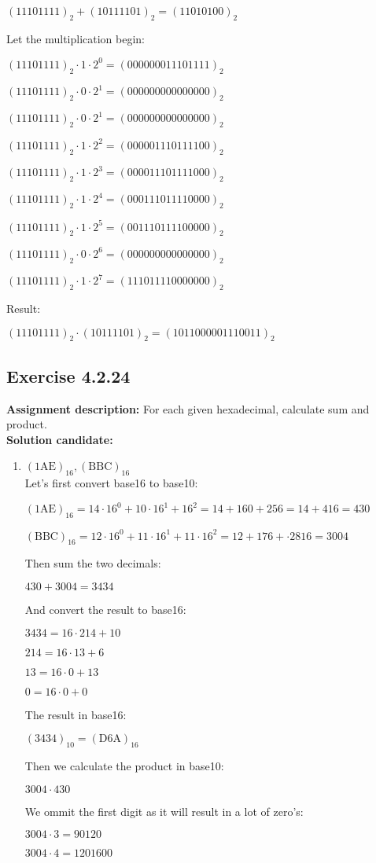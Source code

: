 \documentclass{report}
\newcommand{\cent}[1]{\begin{center}#1\end{center}}
\newcommand{\AssignmentDescription}{\textbf{Assignment description: }}
\newcommand{\Solution}{\textbf{Solution candidate: }}
\newcommand{\Exercise}[1]{\subsection{Exercise #1}}
\newcommand{\defaultEnumerateLabel}{\textbf{\alph*.}}
\newcommand{\MyItem}[1]{\item #1\\}
\newcommand{\decimal}[1]{(#1)_{10}}
\newcommand{\binary}[1]{(#1)_2}
\newcommand{\hexadec}[1]{(\text{#1})_{16}}
\begin{document}
\begin{enumerate}[label=\defaultEnumerateLabel]
\begin{enumerate}[label=\defaultEnumerateLabel]
		\cent{$\binary{11101111} + \binary{10111101} = \binary{11010100}$}
		Let the multiplication begin:
		\cent{$\binary{11101111} \cdot 1 \cdot 2^0 = \binary{000000011101111}$}
		\cent{$\binary{11101111} \cdot 0 \cdot 2^1 = \binary{000000000000000}$}
		\cent{$\binary{11101111} \cdot 0 \cdot 2^1 = \binary{000000000000000}$}
		\cent{$\binary{11101111} \cdot 1 \cdot 2^2 = \binary{000001110111100}$}
		\cent{$\binary{11101111} \cdot 1 \cdot 2^3 = \binary{000011101111000}$}
		\cent{$\binary{11101111} \cdot 1 \cdot 2^4 = \binary{000111011110000}$}
		\cent{$\binary{11101111} \cdot 1 \cdot 2^5 = \binary{001110111100000}$}
		\cent{$\binary{11101111} \cdot 0 \cdot 2^6 = \binary{000000000000000}$}
		\cent{$\binary{11101111} \cdot 1 \cdot 2^7 = \binary{111011110000000}$}
		
		Result:
		
		\cent{$\binary{11101111} \cdot \binary{10111101} = \binary{1011000001110011}$}
		
	\end{enumerate}
	\Exercise{4.2.24}
	\AssignmentDescription
	For each given hexadecimal, calculate sum and product. \\
	
	\Solution
	
	\begin{enumerate}[label = \defaultEnumerateLabel]
		\MyItem{$\hexadec{1AE}, \hexadec{BBC}$}
		
		Let's first convert base16 to base10:
		
		\cent{$\hexadec{1AE} = 14 \cdot 16^0 + 10 \cdot 16^1 + 16^2 =  14 + 160 + 256 = 14 + 416 = 430$}
		\cent{$\hexadec{BBC} = 12 \cdot 16^0 + 11 \cdot 16^1 + 11 \cdot  16^2 = 12 + 176+ \cdot 2816 = 3004$}
		
		Then sum the two decimals:
		
		\cent{$430+3004 = 3434$}
		
		And convert the result to base16:
		
		\cent{$3434 = 16 \cdot 214 + 10$}
		\cent{$214 = 16 \cdot 13 + 6 $}
		\cent{$13 = 16 \cdot 0 + 13 $}
		\cent{$0 = 16 \cdot 0 + 0$}
		
		The result in base16:
		
		\cent{$\decimal{3434} = \hexadec{D6A}$}
		
		Then we calculate the product in base10:
		
		\cent{$3004 \cdot 430$}
		
		We ommit the first digit as it will result in a lot of zero's:
		
		\cent{$3004 \cdot 3 = 90120$}
		\cent{$3004 \cdot 4 = 1201600$}
		

\end{enumerate}
\end{enumerate}
\end{document}
